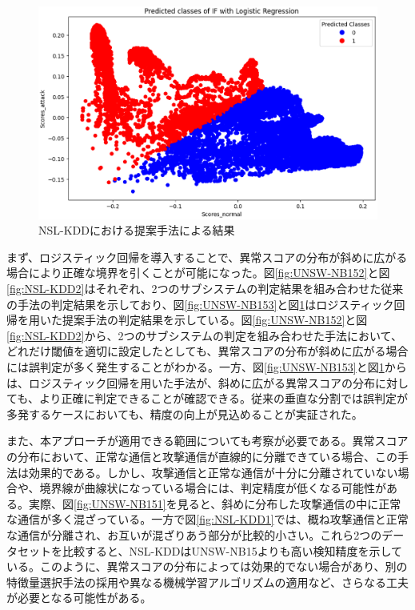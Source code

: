 \documentclass{css}
\begin{document}
\begin{figure}[ht]
    \centering
    \includegraphics[width=\linewidth]{pictures/eps/NSL-KDD3.eps}
    \caption{NSL-KDDにおける提案手法による結果}
    \label{fig:NSL-KDD3}
\end{figure}

まず、ロジスティック回帰を導入することで、異常スコアの分布が斜めに広がる場合により正確な境界を引くことが可能になった。図\ref{fig:UNSW-NB152}と図\ref{fig:NSL-KDD2}はそれぞれ、2つのサブシステムの判定結果を組み合わせた従来の手法の判定結果を示しており、図\ref{fig:UNSW-NB153}と図\ref{fig:NSL-KDD3}はロジスティック回帰を用いた提案手法の判定結果を示している。図\ref{fig:UNSW-NB152}と図\ref{fig:NSL-KDD2}から、2つのサブシステムの判定を組み合わせた手法において、どれだけ閾値を適切に設定したとしても、異常スコアの分布が斜めに広がる場合には誤判定が多く発生することがわかる。一方、図\ref{fig:UNSW-NB153}と図\ref{fig:NSL-KDD3}からは、ロジスティック回帰を用いた手法が、斜めに広がる異常スコアの分布に対しても、より正確に判定できることが確認できる。従来の垂直な分割では誤判定が多発するケースにおいても、精度の向上が見込めることが実証された。

また、本アプローチが適用できる範囲についても考察が必要である。異常スコアの分布において、正常な通信と攻撃通信が直線的に分離できている場合、この手法は効果的である。しかし、攻撃通信と正常な通信が十分に分離されていない場合や、境界線が曲線状になっている場合には、判定精度が低くなる可能性がある。実際、図\ref{fig:UNSW-NB151}を見ると、斜めに分布した攻撃通信の中に正常な通信が多く混ざっている。一方で図\ref{fig:NSL-KDD1}では、概ね攻撃通信と正常な通信が分離され、お互いが混ざりあう部分が比較的小さい。これら2つのデータセットを比較すると、NSL-KDDはUNSW-NB15よりも高い検知精度を示している。このように、異常スコアの分布によっては効果的でない場合があり、別の特徴量選択手法の採用や異なる機械学習アルゴリズムの適用など、さらなる工夫が必要となる可能性がある。
\end{document}
